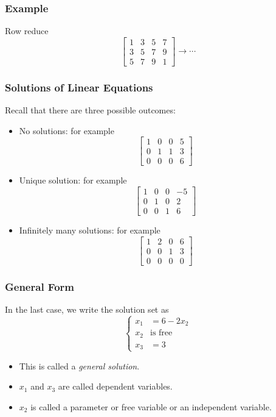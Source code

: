  \begin{frame}[fragile]\frametitle{Example}

 Row reduce 
 \begin{equation*}
   \begin{bmatrix}
   1& 3 & 5 & 7 \\
   3 & 5 & 7 & 9 \\
   5& 7 & 9 & 1
  \end{bmatrix}
  \rightarrow  \cdots
 \end{equation*}

\end{frame}

  \begin{frame}[fragile]\frametitle{Solutions of Linear Equations}
Recall that there are three possible outcomes:  
\begin{itemize}
 \item No solutions: for example
 \[
  \begin{bmatrix}
   1 & 0 & 0 & 5 \\
   0 & 1 & 1 & 3 \\
   0 & 0 & 0 & 6
  \end{bmatrix}
 \]


\item Unique solution: for example
\[
  \left[\begin{array}{rrrr}
   1 & 0 & 0 & -5 \\
   0 & 1 & 0 & 2 \\
   0 & 0 & 1 & 6
  \end{array}\right]
 \]
 
 \item Infinitely many solutions: for example
 \[
  \begin{bmatrix}
   1 & 2 & 0 & 6 \\
   0 & 0 & 1 & 3 \\
   0 & 0 & 0 & 0
  \end{bmatrix}
 \]
 \end{itemize}
 \end{frame}
 
  \begin{frame}[fragile]\frametitle{General Form}
 In the last case, we write the solution set as 
 \[
  \left\{ 
  \begin{array}{rl}
   x_1 & =  6-2x_2 \\
   x_2 &  \mbox{is free}\\
   x_3 & =  3
  \end{array}
  \right.
 \]

\begin{itemize} 
\item This is called a {\em general solution}.
\item  $x_1$ and $x_3$ are called dependent variables.
\item $x_2$ is called a parameter or free variable or an independent variable.
\end{itemize}

\end{frame}

